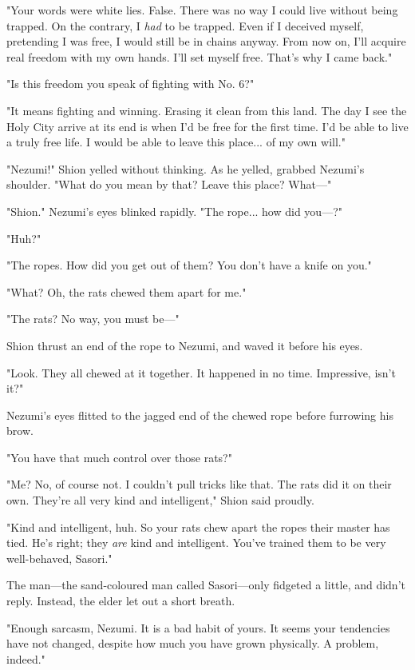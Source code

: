 "Your words were white lies. False. There was no way I could live
without being trapped. On the contrary, I \emph{had} to be trapped. Even if I
deceived myself, pretending I was free, I would still be in chains
anyway. From now on, I'll acquire real freedom with my own hands. I'll
set myself free. That's why I came back."

"Is this freedom you speak of fighting with No. 6?"

"It means fighting and winning. Erasing it clean from this land. The day
I see the Holy City arrive at its end is when I'd be free for the first
time. I'd be able to live a truly free life. I would be able to leave
this place... of my own will."

"Nezumi!" Shion yelled without thinking. As he yelled, grabbed Nezumi's
shoulder. "What do you mean by that? Leave this place? What---"

"Shion." Nezumi's eyes blinked rapidly. "The rope... how did you---?"

"Huh?"

"The ropes. How did you get out of them? You don't have a knife on you."

"What? Oh, the rats chewed them apart for me."

"The rats? No way, you must be---"

Shion thrust an end of the rope to Nezumi, and waved it before his eyes.

"Look. They all chewed at it together. It happened in no time.
Impressive, isn't it?"

Nezumi's eyes flitted to the jagged end of the chewed rope before
furrowing his brow.

"You have that much control over those rats?"

"Me? No, of course not. I couldn't pull tricks like that. The rats did
it on their own. They're all very kind and intelligent," Shion said
proudly.

"Kind and intelligent, huh. So your rats chew apart the ropes their
master has tied. He's right; they \emph{are} kind and intelligent. You've
trained them to be very well-behaved, Sasori."

The man---the sand-coloured man called Sasori---only fidgeted a little, and
didn't reply. Instead, the elder let out a short breath.

"Enough sarcasm, Nezumi. It is a bad habit of yours. It seems your
tendencies have not changed, despite how much you have grown physically.
A problem, indeed."

